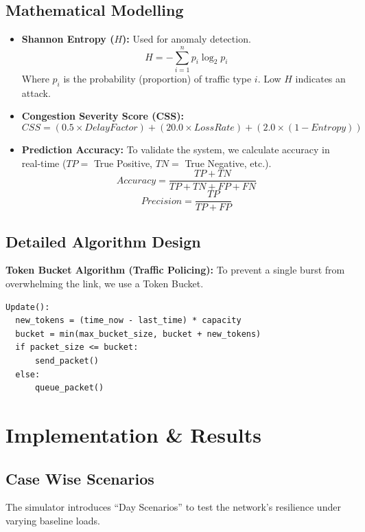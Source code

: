 \documentclass[12pt]{report}
\begin{document}
\section{Mathematical Modelling}
\begin{itemize}
    \item \textbf{Shannon Entropy ($H$):} Used for anomaly detection.
    \begin{equation}
        H = - \sum_{i=1}^{n} p_i \log_2 p_i
    \end{equation}
    Where $p_i$ is the probability (proportion) of traffic type $i$. Low $H$ indicates an attack.
    
    \item \textbf{Congestion Severity Score (CSS):}
    \begin{equation}
        CSS = (0.5 \times DelayFactor) + (20.0 \times LossRate) + (2.0 \times (1 - Entropy))
    \end{equation}
    
    \item \textbf{Prediction Accuracy:}
    \noindent To validate the system, we calculate accuracy in real-time ($TP =$ True Positive, $TN =$ True Negative, etc.).
    \begin{equation}
        Accuracy = \frac{TP + TN}{TP + TN + FP + FN}
    \end{equation}
    \begin{equation}
        Precision = \frac{TP}{TP + FP}
    \end{equation}
\end{itemize}

\section{Detailed Algorithm Design}
\textbf{Token Bucket Algorithm (Traffic Policing):}
To prevent a single burst from overwhelming the link, we use a Token Bucket.
\begin{verbatim}
Update():
  new_tokens = (time_now - last_time) * capacity
  bucket = min(max_bucket_size, bucket + new_tokens)
  if packet_size <= bucket:
      send_packet()
  else:
      queue_packet()
\end{verbatim}

\chapter{Implementation \& Results}

\section{Case Wise Scenarios}
The simulator introduces ``Day Scenarios'' to test the network's resilience under varying baseline loads.
\end{document}
